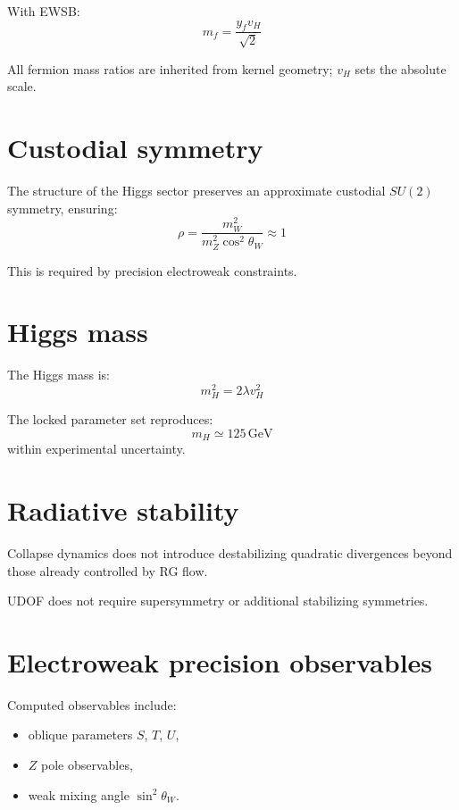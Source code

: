 \documentclass[11pt]{book}
\begin{document}
With EWSB:
\begin{equation}
m_f = \frac{y_f v_H}{\sqrt{2}}
\end{equation}

All fermion mass ratios are inherited from kernel geometry; $v_H$
sets the absolute scale.

\section{Custodial symmetry}

The structure of the Higgs sector preserves an approximate custodial
$SU(2)$ symmetry, ensuring:
\begin{equation}
\rho = \frac{m_W^2}{m_Z^2 \cos^2\theta_W} \approx 1
\end{equation}

This is required by precision electroweak constraints.

\section{Higgs mass}

The Higgs mass is:
\begin{equation}
m_H^2 = 2\lambda v_H^2
\end{equation}

The locked parameter set reproduces:
\begin{equation}
m_H \simeq 125\,\mathrm{GeV}
\end{equation}
within experimental uncertainty.

\section{Radiative stability}

Collapse dynamics does not introduce destabilizing quadratic divergences
beyond those already controlled by RG flow.

UDOF does not require supersymmetry or additional stabilizing symmetries.

\section{Electroweak precision observables}

Computed observables include:
\begin{itemize}
\item oblique parameters $S$, $T$, $U$,
\item $Z$ pole observables,
\item weak mixing angle $\sin^2\theta_W$.
\end{itemize}
\end{document}
